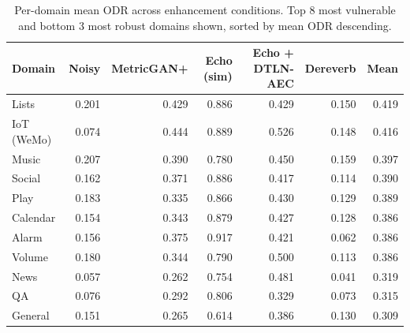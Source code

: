 \begin{table}[t]
\centering\small
\setlength{\tabcolsep}{5pt}
\begin{tabular}{lrrrrrr}
\toprule
\textbf{Domain} & \textbf{Noisy} & \textbf{MetricGAN+} & \textbf{Echo (sim)} & \textbf{Echo + DTLN-AEC} & \textbf{Dereverb} & \textbf{Mean} \\
\midrule
Lists & 0.201 & 0.429 & 0.886 & 0.429 & 0.150 & 0.419 \\
IoT (WeMo) & 0.074 & 0.444 & 0.889 & 0.526 & 0.148 & 0.416 \\
Music & 0.207 & 0.390 & 0.780 & 0.450 & 0.159 & 0.397 \\
Social & 0.162 & 0.371 & 0.886 & 0.417 & 0.114 & 0.390 \\
Play & 0.183 & 0.335 & 0.866 & 0.430 & 0.129 & 0.389 \\
Calendar & 0.154 & 0.343 & 0.879 & 0.427 & 0.128 & 0.386 \\
Alarm & 0.156 & 0.375 & 0.917 & 0.421 & 0.062 & 0.386 \\
Volume & 0.180 & 0.344 & 0.790 & 0.500 & 0.113 & 0.386 \\
\midrule
News & 0.057 & 0.262 & 0.754 & 0.481 & 0.041 & 0.319 \\
QA & 0.076 & 0.292 & 0.806 & 0.329 & 0.073 & 0.315 \\
General & 0.151 & 0.265 & 0.614 & 0.386 & 0.130 & 0.309 \\
\bottomrule
\end{tabular}
\caption{Per-domain mean ODR across enhancement conditions.
Top 8 most vulnerable and bottom 3 most robust domains shown,
sorted by mean ODR descending.}
\label{tab:domain_odr}
\end{table}